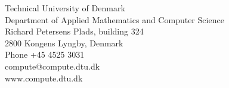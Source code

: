 \thispagestyle{empty}
\vspace*{\fill}

\noindent Technical University of Denmark \\
Department of Applied Mathematics and Computer Science \\
Richard Petersens Plads, building 324 \\
2800 Kongens Lyngby, Denmark \\
Phone +45 4525 3031 \\
compute@compute.dtu.dk \\ 
www.compute.dtu.dk \\